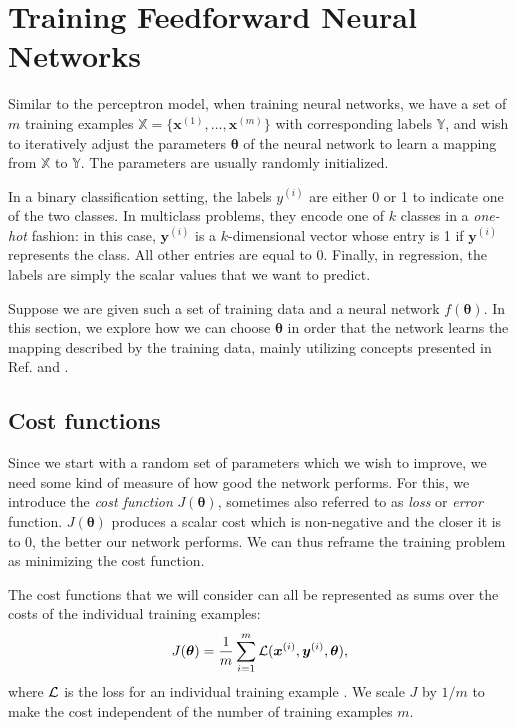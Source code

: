 \section{Training Feedforward Neural Networks}
\label{sec:training}
Similar to the perceptron model, when training neural networks, we have a set of $m$ training examples $\mathbb{X} = \{\bm{x}^{(1)}, \ldots, \bm{x}^{(m)}\}$ with corresponding labels $\mathbb{Y}$, and wish to iteratively adjust the parameters $\bm{\theta}$ of the neural network to learn a mapping from $\mathbb{X}$ to $\mathbb{Y}$. The parameters are usually randomly initialized.

In a binary classification setting, the labels $y^{(i)}$ are either 0 or 1 to indicate one of the two classes. In multiclass problems, they encode one of $k$ classes in a \emph{one-hot} fashion: in this case, $\bm{y}^{(i)}$ is a $k$-dimensional vector whose  entry is 1 if $\bm{y}^{(i)}$ represents the  class. All other entries are equal to 0. Finally, in regression, the labels are simply the scalar values that we want to predict.

Suppose we are given such a set of training data and a neural network $f(\bm{\theta})$. In this section, we explore how we can choose $\bm{\theta}$ in order that the network learns the mapping described by the training data, mainly utilizing concepts presented in Ref. \cite{DBLP:books/daglib/0040158} and \cite{Nielsen2015}.

\subsection{Cost functions}
Since we start with a random set of parameters which we wish to improve, we need some kind of measure of how good the network performs. For this, we introduce the \emph{cost function} $J(\bm{\theta})$, sometimes also referred to as \emph{loss} or \emph{error} function. $J(\bm{\theta})$ produces a scalar cost which is non-negative and the closer it is to 0, the better our network performs. We can thus reframe the training problem as minimizing the cost function.

The cost functions that we will consider can all be represented as sums over the costs of the individual training examples:
\begin{equation}
J(\bm{\theta}) = \frac1{m}\sum_{i=1}^{m}\operatorname{\mathcal{L}}(\bm{x}^{(i)},\bm{y}^{(i)},\bm{\theta}),
\end{equation}
where $\operatorname{\mathcal{L}}$ is the loss for an individual training example \cite[Ch.\,5,\,pp.\,147-148]{DBLP:books/daglib/0040158}. We scale $J$ by $1/m$ to make the cost independent of the number of training examples $m$.

